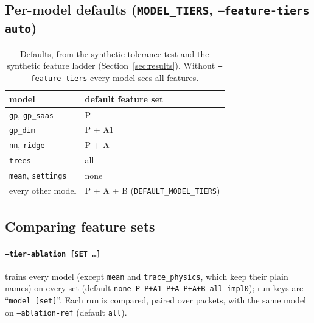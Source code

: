 \documentclass[10pt]{article}
\newcommand{\code}[1]{\texttt{#1}}
\begin{document}
\subsection{Per-model defaults (\code{MODEL\_TIERS}, \code{--feature-tiers auto})}

\begin{table}[H]
\centering\small
\begin{tabular}{ll}
\toprule
model & default feature set \\
\midrule
\code{gp}, \code{gp\_saas} & P \\
\code{gp\_dim} & P + A1 \\
\code{nn}, \code{ridge} & P + A \\
\code{trees} & all \\
\code{mean}, \code{settings} & none \\
every other model & P + A + B (\code{DEFAULT\_MODEL\_TIERS}) \\
\bottomrule
\end{tabular}
\caption{Defaults, from the synthetic tolerance test and the synthetic feature ladder (Section~\ref{sec:results}).
Without \code{--feature-tiers} every model sees all features.}
\end{table}

\subsection{Comparing feature sets}

\paragraph{\code{--tier-ablation [SET \dots]}} trains every model (except \code{mean} and \code{trace\_physics}, which
keep their plain names) on every set (default \code{none P P+A1 P+A P+A+B all impl0}); run keys are
``\code{model [set]}''. Each run is compared, paired over packets, with the same model on \code{--ablation-ref}
(default \code{all}).
\end{document}
